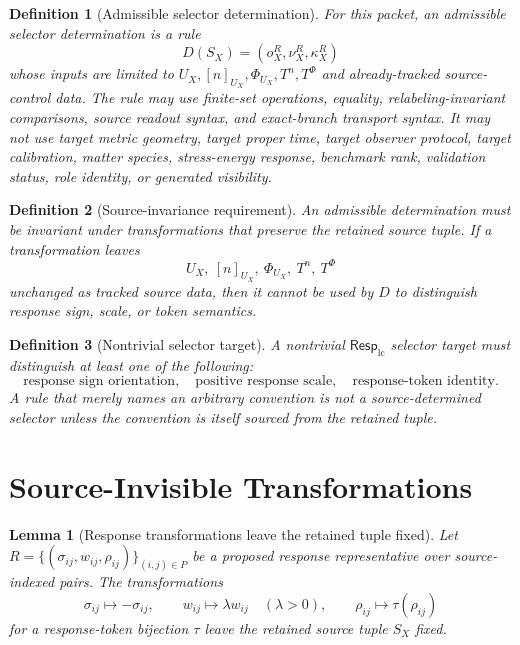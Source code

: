 \documentclass[11pt]{article}
\newcommand{\RespLC}{\mathsf{Resp}_{\mathrm{lc}}}
\newtheorem{definition}{Definition}
\newtheorem{lemma}{Lemma}
\begin{document}
\begin{definition}[Admissible selector determination]
For this packet, an admissible selector determination is a rule
\[
    D(S_X)=(o^R_X,\nu^R_X,\kappa^R_X)
\]
whose inputs are limited to \(U_X,[n]_{U_X},\Phi_{U_X},T^n,T^\Phi\)
and already-tracked source-control data. The rule may use finite-set
operations, equality, relabeling-invariant comparisons, source
readout syntax, and exact-branch transport syntax. It may not use
target metric geometry, target proper time, target observer protocol,
target calibration, matter species, stress-energy response, benchmark
rank, validation status, role identity, or generated visibility.
\end{definition}

\begin{definition}[Source-invariance requirement]
An admissible determination must be invariant under transformations
that preserve the retained source tuple. If a transformation leaves
\[
    U_X,\ [n]_{U_X},\ \Phi_{U_X},\ T^n,\ T^\Phi
\]
unchanged as tracked source data, then it cannot be used by
\(D\) to distinguish response sign, scale, or token semantics.
\end{definition}

\begin{definition}[Nontrivial selector target]
A nontrivial \(\RespLC\) selector target must distinguish at least one
of the following:
\[
    \text{response sign orientation},\quad
    \text{positive response scale},\quad
    \text{response-token identity}.
\]
A rule that merely names an arbitrary convention is not a
source-determined selector unless the convention is itself sourced
from the retained tuple.
\end{definition}

\section{Source-Invisible Transformations}

\begin{lemma}[Response transformations leave the retained tuple fixed]
Let \(R=\{(\sigma_{ij},w_{ij},\rho_{ij})\}_{(i,j)\in P}\) be a
proposed response representative over source-indexed pairs. The
transformations
\[
    \sigma_{ij}\mapsto -\sigma_{ij},\qquad
    w_{ij}\mapsto \lambda w_{ij}\quad(\lambda>0),\qquad
    \rho_{ij}\mapsto \tau(\rho_{ij})
\]
for a response-token bijection \(\tau\) leave the retained source
tuple \(S_X\) fixed.
\end{lemma}
\end{document}
